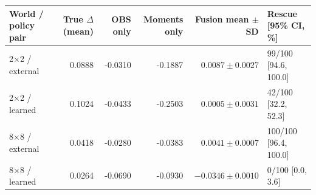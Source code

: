 \begin{tabular}{@{}lrrrrl@{}}
\toprule
World / policy pair & True $\Delta$ (mean) & OBS only & Moments only & Fusion mean $\pm$ SD & Rescue [95\% CI, \%]\\
\midrule
2$\times$2 / external & 0.0888 & -0.0310 & -0.1887 & $0.0087 \pm 0.0027$ & 99/100 [94.6, 100.0] \\
2$\times$2 / learned & 0.1024 & -0.0433 & -0.2503 & $0.0005 \pm 0.0031$ & 42/100 [32.2, 52.3] \\
8$\times$8 / external & 0.0418 & -0.0280 & -0.0383 & $0.0041 \pm 0.0007$ & 100/100 [96.4, 100.0] \\
8$\times$8 / learned & 0.0264 & -0.0690 & -0.0930 & $-0.0346 \pm 0.0010$ & 0/100 [0.0, 3.6] \\
\bottomrule
\end{tabular}
